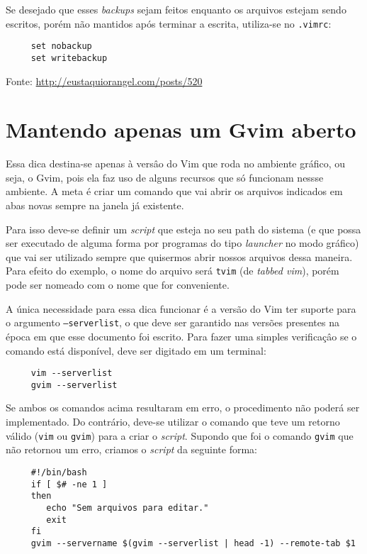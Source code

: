 Se desejado que esses {\em backups} sejam feitos enquanto os arquivos estejam sendo escritos, porém não 
mantidos após terminar a escrita, utiliza-se no \verb|.vimrc|:

\begin{verbatim}
     set nobackup
     set writebackup
\end{verbatim}

Fonte: \url{http://eustaquiorangel.com/posts/520}

\section{Mantendo apenas um Gvim aberto}
\label{Mantenddo apenas um Gvim aberto}

Essa dica destina-se apenas à versâo do Vim que roda no ambiente gráfico, ou seja, o Gvim, pois ela faz uso
de alguns recursos que só funcionam nessse ambiente. A meta é criar um comando que vai abrir os arquivos indicados
em abas novas sempre na janela já existente. 

Para isso deve-se definir um {\em script} que esteja no seu path do sistema 
(e que possa ser executado de alguma forma por programas do tipo {\em launcher} no modo gráfico) que vai ser utilizado 
sempre que quisermos abrir nossos arquivos dessa maneira. Para efeito do exemplo, o nome do arquivo será {\tt tvim} 
(de {\em tabbed vim}), porém pode ser nomeado com o nome que for conveniente.

A única necessidade para essa dica funcionar é a versão do Vim ter suporte para o argumento {\tt --serverlist},
o que deve ser garantido nas versões presentes na época em que esse documento foi escrito. Para fazer uma simples
verificaçâo se o comando está disponível, deve ser digitado em um terminal:

\begin{verbatim}
     vim --serverlist
     gvim --serverlist
\end{verbatim}

Se ambos os comandos acima resultaram em erro, o procedimento não poderá ser implementado. Do contrário, deve-se
utilizar o comando que teve um retorno válido ({\tt vim} ou {\tt gvim}) para a criar o {\em script}. Supondo que foi o 
comando {\tt gvim} que não retornou um erro, criamos o {\em script} da seguinte forma:

\begin{verbatim}
     #!/bin/bash
     if [ $# -ne 1 ]
     then
        echo "Sem arquivos para editar."
        exit
     fi
     gvim --servername $(gvim --serverlist | head -1) --remote-tab $1
\end{verbatim}

